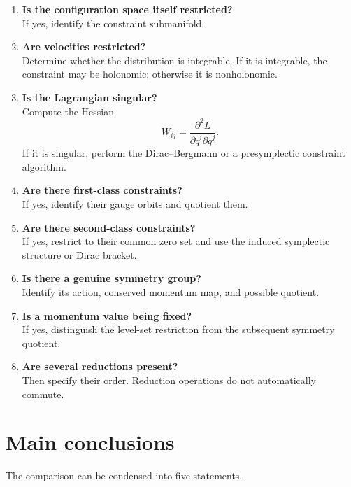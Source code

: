 \documentclass[11pt,a4paper]{article}
\theoremstyle{definition}
\begin{document}
\begin{enumerate}
\item \textbf{Is the configuration space itself restricted?}\\
If yes, identify the constraint submanifold.

\item \textbf{Are velocities restricted?}\\
Determine whether the distribution is integrable.  If it is integrable, the
constraint may be holonomic; otherwise it is nonholonomic.

\item \textbf{Is the Lagrangian singular?}\\
Compute the Hessian
\[
        W_{ij}=
        \frac{\partial^2L}{\partial\dot q^i\partial\dot q^j}.
\]
If it is singular, perform the Dirac--Bergmann or a presymplectic constraint
algorithm.

\item \textbf{Are there first-class constraints?}\\
If yes, identify their gauge orbits and quotient them.

\item \textbf{Are there second-class constraints?}\\
If yes, restrict to their common zero set and use the induced symplectic
structure or Dirac bracket.

\item \textbf{Is there a genuine symmetry group?}\\
Identify its action, conserved momentum map, and possible quotient.

\item \textbf{Is a momentum value being fixed?}\\
If yes, distinguish the level-set restriction from the subsequent symmetry
quotient.

\item \textbf{Are several reductions present?}\\
Then specify their order.  Reduction operations do not automatically commute.
\end{enumerate}

\section{Main conclusions}

The comparison can be condensed into five statements.
\end{document}
